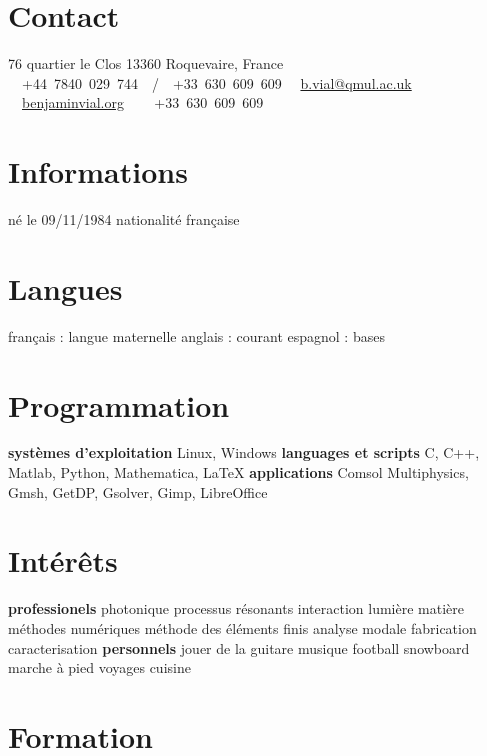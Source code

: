 \documentclass[]{cv} %
\begin{document}


\begin{aside} %
\section{Contact}
76 quartier le Clos
13360 Roquevaire, France
\faPhone~~+44~7840~029~744~~/~~+33~630~609~609
\faEnvelope~~\href{mailto:b.vial@qmul.ac.uk}{b.vial@qmul.ac.uk}
\faUser~~\href{www.benjaminvial.org}{benjaminvial.org}
~
\faPhone~~+33~630~609~609
\section{Informations}
né le 09/11/1984
nationalité française
\section{Langues}
français : langue maternelle
anglais : courant
espagnol : bases
\section{Programmation}
\textbf{systèmes d'exploitation}
Linux, Windows
\textbf{languages et scripts}
C, C++, Matlab, Python, Mathematica, \LaTeX
\textbf{applications}
Comsol Multiphysics, Gmsh, GetDP, Gsolver, Gimp, LibreOffice
\section{Intérêts}
\textbf{professionels}
photonique
processus résonants
interaction lumière matière
méthodes numériques
méthode des éléments finis
analyse modale
fabrication
caracterisation
\textbf{personnels}
jouer de la guitare
musique
football
snowboard
marche à pied
voyages
cuisine
\end{aside}



\section{Formation}
\end{document}
